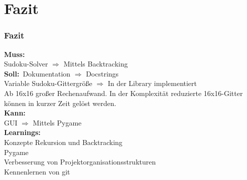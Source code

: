 \documentclass{beamer}
\begin{document}
\section{Fazit}
\begin{frame}
	\frametitle{Fazit} 
	\textbf{Muss:} \\
	Sudoku-Solver $\Rightarrow$ Mittels Backtracking\\
	\textbf{Soll:}\
		Dokumentation $\Rightarrow$ Docstrings\\
		Variable Sudoku-Gittergröße $\Rightarrow$ In der Library implementiert\\
		Ab 16x16 großer Rechenaufwand. In der Komplexität reduzierte 16x16-Gitter\\ können in kurzer Zeit gelöst werden.\\
		\textbf{Kann: }\\
		GUI $\Rightarrow$ Mittels Pygame\\
		
		\textbf{Learnings:}\\
		Konzepte Rekursion und Backtracking\\
		Pygame\\
		Verbesserung von Projektorganisationsstrukturen\\
		Kennenlernen von git\\
	\end{frame}
\end{document}
